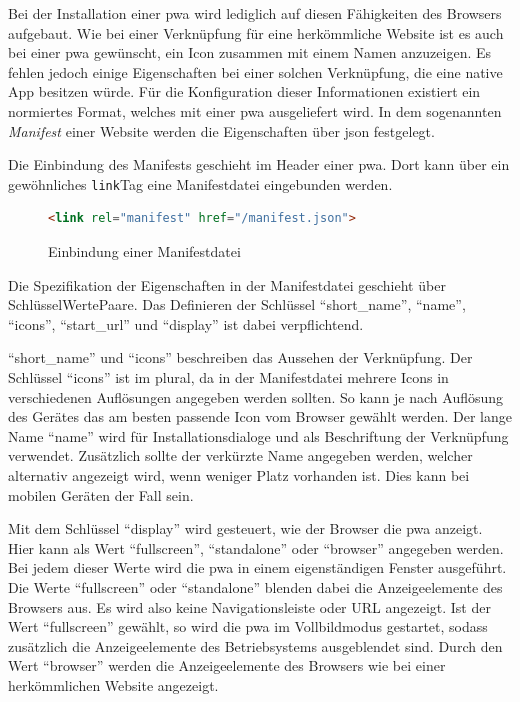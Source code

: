 \documentclass[12pt, parskip=half]{scrartcl}       %
\begin{document}
Bei der Installation einer \ac{pwa} wird lediglich auf diesen Fähigkeiten des Browsers aufgebaut.
Wie bei einer Verknüpfung für eine herkömmliche Website ist es auch bei einer \ac{pwa} gewünscht, ein Icon zusammen mit einem Namen anzuzeigen.
Es fehlen jedoch einige Eigenschaften bei einer solchen Verknüpfung, die eine native App besitzen würde.
Für die Konfiguration dieser Informationen existiert ein normiertes Format, welches mit einer \ac{pwa} ausgeliefert wird.
In dem sogenannten \textit{Manifest} einer Website werden die Eigenschaften über \ac{json} festgelegt.

Die Einbindung des Manifests geschieht im Header einer \ac{pwa}.
Dort kann über ein gewöhnliches \texttt{link}\-Tag eine Manifestdatei eingebunden werden.

\begin{figure}[h]
\begin{lstlisting}[language=HTML]
                <link rel="manifest" href="/manifest.json">
\end{lstlisting}
\caption{Einbindung einer Manifestdatei}
\label{fig:html_linkmanifest}
\end{figure}

Die Spezifikation der Eigenschaften in der Manifestdatei geschieht über Schlüssel\-Werte\-Paare.
Das Definieren der Schlüssel \enquote{short\_name}, \enquote{name}, \enquote{icons}, \enquote{start\_url} und \enquote{display} ist dabei verpflichtend.

\enquote{short\_name} und \enquote{icons} beschreiben das Aussehen der Verknüpfung.
Der Schlüssel \enquote{icons} ist im plural, da in der Manifestdatei mehrere Icons in verschiedenen Auflösungen angegeben werden sollten.
So kann je nach Auflösung des Gerätes das am besten passende Icon vom Browser gewählt werden.
Der lange Name \enquote{name} wird für Installationsdialoge und als Beschriftung der Verknüpfung verwendet.
Zusätzlich sollte der verkürzte Name angegeben werden, welcher alternativ angezeigt wird, wenn weniger Platz vorhanden ist\cite{chromedevs_manifestname}.
Dies kann bei mobilen Geräten der Fall sein.

Mit dem Schlüssel \enquote{display} wird gesteuert, wie der Browser die \ac{pwa} anzeigt.
Hier kann als Wert \enquote{fullscreen}, \enquote{standalone} oder \enquote{browser} angegeben werden.
Bei jedem dieser Werte wird die \ac{pwa} in einem eigenständigen Fenster ausgeführt.
Die Werte \enquote{fullscreen} oder \enquote{standalone} blenden dabei die Anzeigeelemente des Browsers aus.
Es wird also keine Navigationsleiste oder URL angezeigt.
Ist der Wert \enquote{fullscreen} gewählt, so wird die \ac{pwa} im Vollbildmodus gestartet, sodass zusätzlich die Anzeigeelemente des Betriebsystems ausgeblendet sind.
Durch den Wert \enquote{browser} werden die Anzeigeelemente des Browsers wie bei einer herkömmlichen Website angezeigt\cite{googledev_manifest}.
\end{document}
